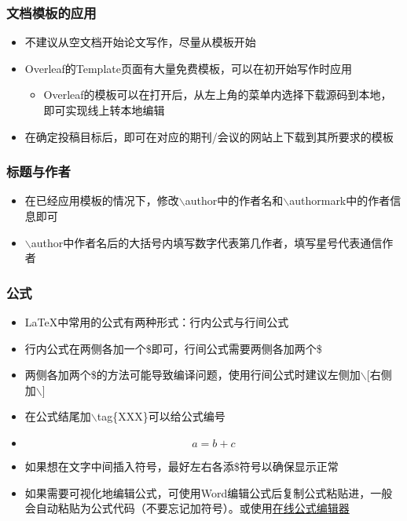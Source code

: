 \documentclass{beamer}
\begin{document}
\begin{frame} 
    \frametitle{文档模板的应用} 
    \begin{itemize} 
        \item 不建议从空文档开始论文写作，尽量从模板开始
        \item Overleaf的Template页面有大量免费模板，可以在初开始写作时应用
        \begin{itemize}
            \item Overleaf的模板可以在打开后，从左上角的菜单内选择下载源码到本地，即可实现线上转本地编辑
        \end{itemize}
        \item 在确定投稿目标后，即可在对应的期刊/会议的网站上下载到其所要求的模板
    \end{itemize} 
\end{frame}

\begin{frame} 
    \frametitle{标题与作者} 
    \begin{itemize} 
        \item 在已经应用模板的情况下，修改$\backslash$author中的作者名和$\backslash$authormark中的作者信息即可
        \item $\backslash$author中作者名后的大括号内填写数字代表第几作者，填写星号代表通信作者
    \end{itemize} 
\end{frame}

\begin{frame} 
    \frametitle{公式} 
    \begin{itemize} 
        \item \LaTeX{}中常用的公式有两种形式：行内公式与行间公式
        \item 行内公式在两侧各加一个\$即可，行间公式需要两侧各加两个\$
        \item 两侧各加两个\$的方法可能导致编译问题，使用行间公式时建议左侧加$\backslash$[右侧加$\backslash$]
        \item 在公式结尾加$\backslash$tag\{XXX\}可以给公式编号
        \item \[a=b+c \tag*{5.1}\]
        \item 如果想在文字中间插入符号，最好左右各添\$符号以确保显示正常
        \item 如果需要可视化地编辑公式，可使用Word编辑公式后复制公式粘贴进，一般会自动粘贴为公式代码（不要忘记加符号）。或使用\href{https://latex.codecogs.com/eqneditor/editor.php?lang=zh-cn}{在线公式编辑器}
    \end{itemize} 
\end{frame}
\end{document}
